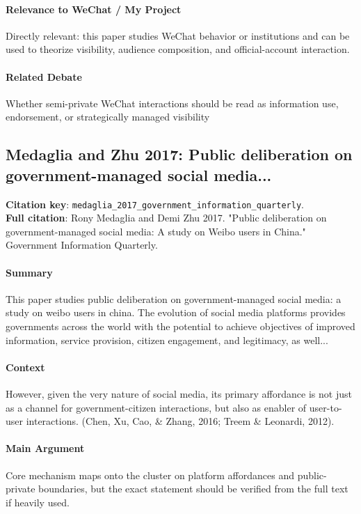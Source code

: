 \documentclass[12pt]{article}
\begin{document}
\paragraph{Relevance to WeChat / My Project} Directly relevant: this paper studies WeChat behavior or institutions and can be used to theorize visibility, audience composition, and official-account interaction.

\paragraph{Related Debate} Whether semi-private WeChat interactions should be read as information use, endorsement, or strategically managed visibility


\subsection{Medaglia and Zhu 2017: Public deliberation on government-managed social media...}
\textbf{Citation key}: \texttt{medaglia\_2017\_government\_information\_quarterly}.\\
\textbf{Full citation}: Rony Medaglia and Demi Zhu 2017. "Public deliberation on government-managed social media: A study on Weibo users in China." Government Information Quarterly.

\paragraph{Summary} This paper studies public deliberation on government-managed social media: a study on weibo users in china. The evolution of social media platforms provides governments across the world with the potential to achieve objectives of improved information, service provision, citizen engagement, and legitimacy, as well...

\paragraph{Context} However, given the very nature of social media, its primary affordance is not just as a channel for government-citizen interactions, but also as enabler of user-to-user interactions. (Chen, Xu, Cao, \& Zhang, 2016; Treem \& Leonardi, 2012).

\paragraph{Main Argument} Core mechanism maps onto the cluster on platform affordances and public-private boundaries, but the exact statement should be verified from the full text if heavily used.
\end{document}
